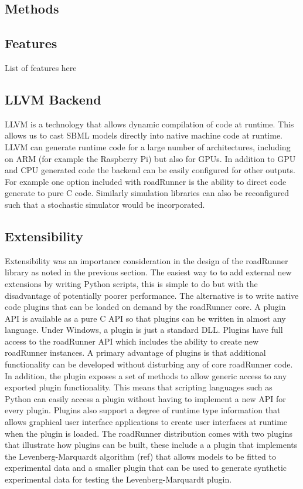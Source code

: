 \documentclass{bioinfo}
\begin{document}
\begin{methods}
\section{Methods}

\subsection{Features}

List of features here

\subsection{LLVM Backend}

LLVM is a technology that allows dynamic compilation of code at runtime. This allows us to cast SBML models directly into native machine code at runtime. LLVM can generate runtime code for a large number of architectures, including on ARM (for example the  Raspberry Pi) but also for GPUs. In addition to GPU and CPU generated code the backend can be easily configured for other outputs. For example one option included with roadRunner is the ability to direct code generate to pure C code. Similarly simulation libraries can also be reconfigured such that a stochastic simulator would be incorporated.

\subsection{Extensibility}

Extensibility was an importance consideration in the design of the roadRunner library as noted in the previous section. The easiest way to to add external new extensions by writing Python scripts, this is simple to do but with the disadvantage of potentially poorer performance. The alternative is to write native code plugins that can be loaded on demand by the roadRunner core. A plugin API is available as a pure C API so that plugins can be written in almost any language. Under Windows, a plugin is just a standard DLL. Plugins have full access to the roadRunner API which includes the ability to create new roadRunner instances. A primary advantage of plugins is that additional functionality can be developed without disturbing any of core roadRunner code. In addition, the plugin exposes a set of methods to allow generic access to any exported plugin functionality. This means that scripting languages such as Python can easily access a plugin without having to implement a new API for every plugin. Plugins also support a degree of runtime type information that allows graphical user interface applications to create user interfaces at runtime when the plugin is loaded. The roadRunner distribution comes with two plugins that illustrate how plugins can be built, these include a a plugin that implements the Levenberg-Marquardt algorithm (ref) that allows models to be fitted to experimental data and a smaller plugin that can be used to generate synthetic experimental data for testing the Levenberg-Marquardt plugin.



\end{methods}
\end{document}
